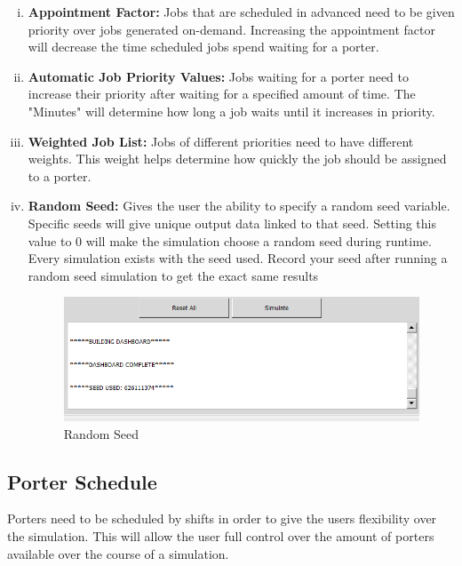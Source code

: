 \documentclass[paper=letter, fontsize=10pt]{scrartcl}
\numberwithin{equation}{section}		%
\numberwithin{figure}{section}			%
\numberwithin{table}{section}				%
\begin{document}
	\begin{enumerate}[(i)]
		\item \textbf{Appointment Factor:} Jobs that are scheduled in advanced need to be given priority over jobs generated on-demand.  Increasing the appointment factor will decrease the time scheduled jobs spend waiting for a porter.
		\item \textbf{Automatic Job Priority Values:} Jobs waiting for a porter need to increase their priority after waiting for a specified amount of time.  The "Minutes" will determine how long a job waits until it increases in priority.
		\item \textbf{Weighted Job List:} Jobs of different priorities need to have different weights.  This weight helps determine how quickly the job should be assigned to a porter.
		\item \textbf{Random Seed:} Gives the user the ability to specify a random seed variable. Specific seeds will give unique output data linked to that seed. Setting this value to 0 will make the simulation choose a random seed during runtime. Every simulation exists with the seed used. Record your seed after running a random seed simulation to get the exact same results
		\begin{figure}[!htbp]		
		\begin{center}
			\includegraphics[width=1\columnwidth, height=0.45\textheight, keepaspectratio]{randomSeed.png}
			\caption{Random Seed}
		\end{center}
		\end{figure} 
	\end{enumerate}
	
	\subsection{Porter Schedule}
	Porters need to be scheduled by shifts in order to give the users flexibility over the simulation.  This will allow the user full control over the amount of porters available over the course of a simulation.
	
\end{document}
